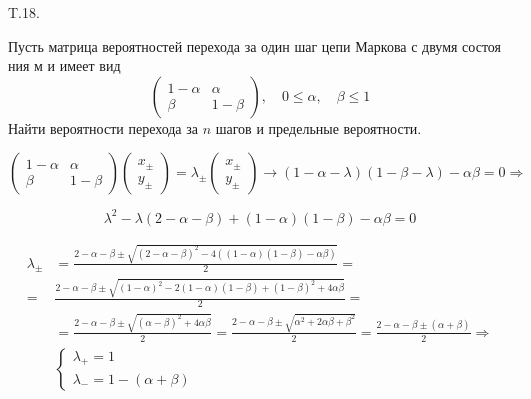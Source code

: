 \documentclass[a4paper,12pt]{article} %
\begin{document}
\begin{example} T.18. 

Пусть матрица вероятностей перехода за один шаг цепи Маркова с двумя состоя ния м и имеет вид
$$
\left(\begin{array}{cc}
1-\alpha & \alpha \\
\beta & 1-\beta
\end{array}\right), \quad 0 \leqslant \alpha, \quad \beta \leqslant 1
$$
Найти вероятности перехода за $n$ шагов и предельные вероятности.



$$
\left(\begin{array}{cc}
1-\alpha & \alpha \\
\beta & 1-\beta
\end{array}\right)
\left(\begin{array}{l}
x_{\pm} \\
y_{\pm}
\end{array}\right)
=
\lambda_{\pm}
\left(\begin{array}{l}
x_{\pm} \\
y_{\pm}
\end{array}\right) \rightarrow(1-\alpha-\lambda)(1-\beta-\lambda)-\alpha \beta=0 
\Rightarrow 
$$


\[ \lambda^{2}-\lambda(2-\alpha-\beta)+(1-\alpha)(1-\beta)-\alpha \beta=0  \]

$$
\begin{aligned}
\lambda_{\pm} &=\frac{2-\alpha-\beta \pm \sqrt{(2-\alpha-\beta)^{2}-4((1-\alpha)(1-\beta)-\alpha \beta)}}{2}=\\
=&\frac{2-\alpha-\beta \pm \sqrt{(1-\alpha)^{2}-2(1-\alpha)(1-\beta)+(1-\beta)^{2}+4 \alpha \beta}}{2}=\\
&=\frac{2-\alpha-\beta \pm \sqrt{(\alpha-\beta)^{2}+4 \alpha \beta}}{2}=\frac{2-\alpha-\beta \pm \sqrt{\alpha^{2}+2 \alpha \beta+\beta^{2}}}{2}=\frac{2-\alpha-\beta \pm(\alpha+\beta)}{2} \Rightarrow \\
&\left\{\begin{array}{l}
	\lambda_{+}=1 \\
	\lambda_{-}=1-(\alpha+\beta)
\end{array}\right.
\end{aligned}
$$



\end{example}
\end{document}
